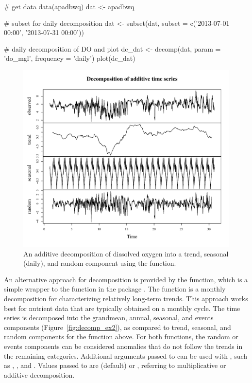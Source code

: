 \begin{example}
# get data
data(apadbwq)
dat <- apadbwq

# subset for daily decomposition
dat <- subset(dat, subset = c('2013-07-01 00:00', '2013-07-31 00:00'))

# daily decomposition of DO and plot
dc_dat <- decomp(dat, param = 'do_mgl', frequency = 'daily')
plot(dc_dat)
\end{example}
\begin{figure}[!h]

{\centering \includegraphics[width=\textwidth]{decomp_ex1-1} 

}

\caption[An additive decomposition of dissolved oxygen into a trend, seasonal (daily), and random component using the  function]{An additive decomposition of dissolved oxygen into a trend, seasonal (daily), and random component using the  function.}\label{fig:decomp_ex1}
\end{figure}

An alternative approach for decomposition is provided by the  function, which is a simple wrapper to the  function in the  package \citep{Cloern10,Jassby14}.  The  function is a monthly decomposition for characterizing relatively long-term trends.  This approach works best for nutrient data that are typically obtained on a monthly cycle.  The time series is decomposed into the grandmean, annual, seasonal, and events components (Figure~\ref{fig:decomp_ex2}), as compared to trend, seasonal, and random components for the  function above.  For both functions, the random or events components can be considered anomalies that do not follow the trends in the remaining categories.  Additional arguments passed to  can be used with , such as , , and .  Values passed to  are  (default) or , referring to multiplicative or additive decomposition.

